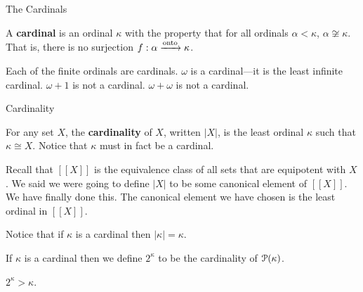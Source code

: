 \documentclass[pdf,final]{prosper}
\newcommand{\skipsmall}{\vspace{1em}}
\newcommand{\skipmed}{\vspace{2em}}
\begin{document}
\begin{slide}{The Cardinals}
\begin{definition}
A \textbf{cardinal} is an ordinal $\kappa$ with the property that for all
ordinals $\alpha<\kappa$, $\alpha\not\cong\kappa$. That is, there is no
surjection $f:\alpha\xrightarrow{\text{onto}}\kappa$.
\end{definition}

\skipmed

\begin{remark}
Each of the finite ordinals are cardinals. $\omega$ is a cardinal---it
is the least infinite cardinal. $\omega+1$ is not a cardinal. $\omega+\omega$ is
not a cardinal.
\end{remark}


\end{slide}

\begin{slide}{Cardinality}
\begin{definition}
For any set $X$, the \textbf{cardinality} of $X$, written $|X|$, is the least
ordinal $\kappa$ such that $\kappa\cong X$. Notice that $\kappa$ must in fact be
a cardinal.
\end{definition}

\skipsmall

\begin{remark}
Recall that $[[X]]$ is the equivalence class of all sets that are
equipotent with $X$. We said we were going to define $|X|$ to be
some canonical element of $[[X]]$. We
have finally done this. The canonical element we have chosen is the
least ordinal in $[[X]]$.
\end{remark}

\skipsmall
Notice that if $\kappa$ is a cardinal then $|\kappa|=\kappa$.

\skipsmall

\begin{definition}
If $\kappa$ is a cardinal then we define $2^{\kappa}$ to be the cardinality of $\operatorname{\mathcal{P}}(\kappa)$.
\end{definition}

\skipsmall

\begin{remark} 
$2^{\kappa}>\kappa$.
\end{remark}

\end{slide}
\end{document}
